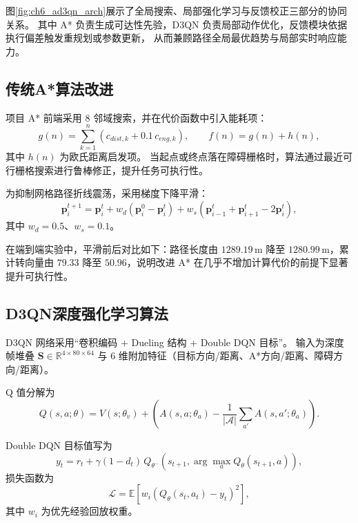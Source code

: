 图\ref{fig:ch6_ad3qn_arch}展示了全局搜索、局部强化学习与反馈校正三部分的协同关系。
其中 A* 负责生成可达性先验，D3QN 负责局部动作优化，反馈模块依据执行偏差触发重规划或参数更新，
从而兼顾路径全局最优趋势与局部实时响应能力。

\subsection{传统A*算法改进}
\label{subsec:ch6_astar_improve}

项目 A* 前端采用 8 邻域搜索，并在代价函数中引入能耗项：
\begin{equation}
g(n)=\sum_{k=1}^{n}\left(c_{dist,k}+0.1\,c_{eng,k}\right),\qquad
f(n)=g(n)+h(n),
\label{eq:ch6_astar_cost}
\end{equation}
其中 $h(n)$ 为欧氏距离启发项。
当起点或终点落在障碍栅格时，算法通过最近可行栅格搜索进行鲁棒修正，提升任务可执行性。

为抑制网格路径折线震荡，采用梯度下降平滑：
\begin{equation}
\mathbf{p}_{i}^{t+1}=\mathbf{p}_{i}^{t}
+w_d\left(\mathbf{p}_{i}^{0}-\mathbf{p}_{i}^{t}\right)
+w_s\left(\mathbf{p}_{i-1}^{t}+\mathbf{p}_{i+1}^{t}-2\mathbf{p}_{i}^{t}\right),
\label{eq:ch6_path_smooth}
\end{equation}
其中 $w_d=0.5$、$w_s=0.1$。

在端到端实验中，平滑前后对比如下：路径长度由 $1289.19\,\mathrm{m}$ 降至 $1280.99\,\mathrm{m}$，累计转向量由 $79.33$ 降至 $50.96$，说明改进 A* 在几乎不增加计算代价的前提下显著提升可执行性。

\subsection{D3QN深度强化学习算法}
\label{subsec:ch6_d3qn}

D3QN 网络采用“卷积编码 + Dueling 结构 + Double DQN 目标”。
输入为深度帧堆叠 $\mathbf{S}\in \mathbb{R}^{4\times80\times64}$ 与 6 维附加特征（目标方向/距离、A*方向/距离、障碍方向/距离）。

Q 值分解为
\begin{equation}
Q(s,a;\theta)=V(s;\theta_v)+\left(A(s,a;\theta_a)-\frac{1}{|\mathcal{A}|}\sum_{a'}A(s,a';\theta_a)\right).
\label{eq:ch6_dueling_q}
\end{equation}

Double DQN 目标值写为
\begin{equation}
y_t=r_t+\gamma(1-d_t)\,Q_{\theta^-}\!\left(s_{t+1},
\arg\max_{a}Q_{\theta}(s_{t+1},a)\right),
\label{eq:ch6_ddqn_target}
\end{equation}
损失函数为
\begin{equation}
\mathcal{L}=\mathbb{E}\left[w_i\left(Q_{\theta}(s_t,a_t)-y_t\right)^2\right],
\label{eq:ch6_d3qn_loss}
\end{equation}
其中 $w_i$ 为优先经验回放权重。

